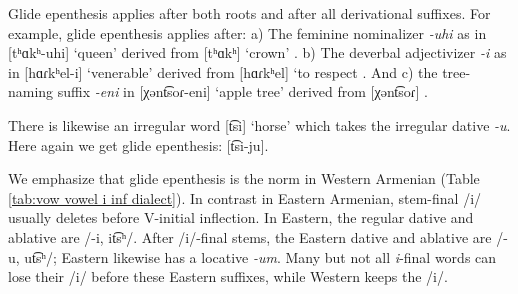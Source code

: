 {	\begin{table}[H]
		\centering
		\caption{Glide epenthesis between /i/ and V-initial inflection}
		\label{tab:vow vowel i inf}
		\end{table} 
	
	Glide epenthesis  applies after both roots and after all derivational suffixes. For example, glide epenthesis applies after: a) The feminine nominalizer \textit{-uhi} as in  [tʰɑkʰ-uhi]  `queen' derived from [tʰɑkʰ] `crown' . b) The deverbal adjectivizer \textit{-i} as in [hɑɾkʰel-i] `venerable' derived from [hɑɾkʰel] `to respect . And c) the tree-naming suffix \textit{-eni} in [χənt͡soɾ-eni] `apple tree' derived from  [χənt͡soɾ] . 
	
	There is likewise  an irregular word [t͡si] `horse'  which takes the irregular dative \textit{-u}. Here again we get glide epenthesis: [t͡si-ju]. 
	
	We emphasize that glide epenthesis is the norm in Western Armenian (Table \ref{tab:vow vowel i inf dialect}). In contrast in Eastern Armenian, stem-final /i/ usually deletes before V-initial inflection. In Eastern, the regular dative and ablative are /-i, it͡sʰ/. After /i/-final stems, the Eastern dative and ablative  are  /-u, ut͡sʰ/; Eastern likewise has a locative \textit{-um}. Many but not all \textit{i}-final words can lose their /i/ before these Eastern suffixes, while Western keeps the /i/. 
	
}
